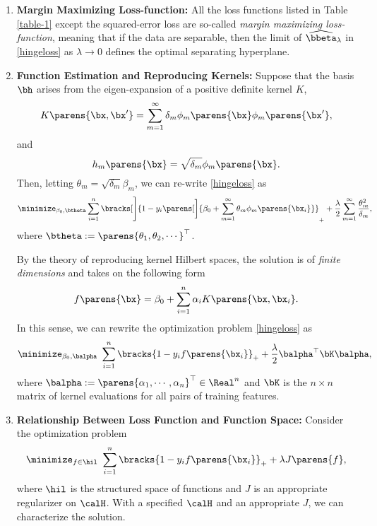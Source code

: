 \documentclass[12pt]{article}
\begin{document}
\begin{enumerate}[label=\textbf{\arabic*.}]
	\item \textbf{Margin Maximizing Loss-function:} All the loss functions listed in Table \ref{table-1} except the squared-error loss are so-called \textit{margin maximizing loss-function}, meaning that if the data are separable, then the limit of $\widehat{\bbeta}_{\lambda}$ in \eqref{hingeloss} as $\lambda \to 0$ defines the optimal separating hyperplane. 
	
	\item \textbf{Function Estimation and Reproducing Kernels:} Suppose that the basis $\bh$ arises from the eigen-expansion of a positive definite kernel $K$, 
	\begin{equation*}
		K \parens{\bx, \bx'} = \sum_{m=1}^\infty \delta_m \phi_m \parens{\bx} \phi_m \parens{\bx'}, 
	\end{equation*}
	and 
	\begin{equation*}
		h_m \parens{\bx} = \sqrt{\delta_m} \phi_m \parens{\bx}. 
	\end{equation*}
	Then, letting $\theta_m = \sqrt{\delta_m} \beta_m$, we can re-write \eqref{hingeloss} as 
	\begin{equation*}
		\minimize_{\beta_0, \btheta} \sum_{i=1}^n \bracks[\Bigg]{1 - y_i \parens[\bigg]{\beta_0 + \sum_{m=1}^\infty \theta_m \phi_m \parens{\bx_i}} }_+ + \frac{\lambda}{2} \sum_{m=1}^\infty \frac{\theta_m^2}{\delta_m}, 
	\end{equation*}
	where $\btheta := \parens{\theta_1, \theta_2, \cdots}^{\top}$. 
	
	By the theory of reproducing kernel Hilbert spaces, the solution is of \emph{finite dimensions} and takes on the following form 
	\begin{equation*}
		f \parens{\bx} = \beta_0 + \sum_{i=1}^n \alpha_i K \parens{\bx, \bx_i}. 
	\end{equation*}
	In this sense, we can rewrite the optimization problem \eqref{hingeloss} as 
	\begin{equation*}
		\minimize_{\beta_0, \balpha} \  \sum_{i=1}^n \bracks{1 - y_i f \parens{\bx_i}}_+ + \frac{\lambda}{2} \balpha^\top \bK \balpha, 
	\end{equation*}
	where $\balpha := \parens{\alpha_1, \cdots, \alpha_n}^\top \in \Real^n$ and $\bK$ is the $n \times n$ matrix of kernel evaluations for all pairs of training features. 
	
	\item \textbf{Relationship Between Loss Function and Function Space:} Consider the optimization problem 
	\begin{equation*}
		\minimize_{f \in \hil} \ \sum_{i=1}^n \bracks{1 - y_i f \parens{\bx_i}}_+ + \lambda J \parens{f}, 
	\end{equation*}
	where $\hil$ is the structured space of functions and $J$ is an appropriate regularizer on $\calH$. With a specified $\calH$ and an appropriate $J$, we can characterize the solution. 
	

\end{enumerate}
\end{document}
